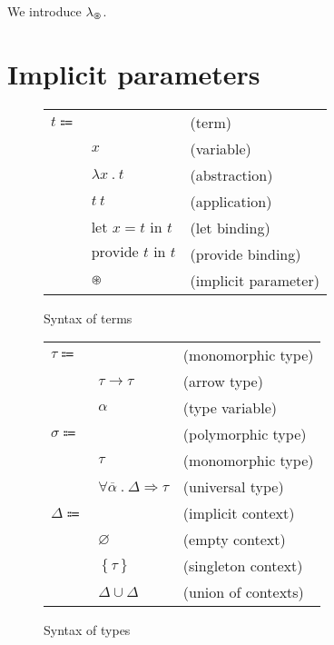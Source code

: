 \documentclass[acmlarge]{acmart}
\newcommand\lambdaimplicit{\lambda_{\varoast}}
\newcommand\labs[2]{\lambda #1 \ . \ #2}
\newcommand\app[2]{#1 \ #2}
\newcommand\llet[3]{\text{let } #1 = #2 \text{ in } #3}
\newcommand\provide[2]{\text{provide } #1 \text{ in } #2}
\newcommand\larrow[2]{#1 \rightarrow #2}
\newcommand\tabs[3]{\forall #1 \ . \ #2 \Rightarrow #3}
\begin{document}
  We introduce $\lambdaimplicit$.

\section{Implicit parameters}

  \begin{figure}[h!]
    \begin{mdframed}

      \begin{tabular}{l l l}
        $t \Coloneqq $ & & (term) \\
        & $x$ & (variable) \\
        & $\labs{x}{t}$ & (abstraction) \\
        & $\app{t}{t}$ & (application) \\
        & $\llet{x}{t}{t}$ & (let binding) \\
        & $\provide{t}{t}$ & (provide binding) \\
        & $\varoast$ & (implicit parameter)
      \end{tabular}

    \end{mdframed}
    \caption{Syntax of terms}
    \label{fig:terms_syntax}
  \end{figure}

  \begin{figure}[h!]
    \begin{mdframed}

      \begin{tabular}{l l l}
        $\tau \Coloneqq $ & & (monomorphic type) \\
        & $\larrow{\tau}{\tau}$ & (arrow type) \\
        & $\alpha$ & (type variable) \\
        $\sigma \Coloneqq $ & & (polymorphic type) \\
        & $\tau$ & (monomorphic type) \\
        & $\tabs{\overline{\alpha}}{\Delta}{\tau}$ & (universal type) \\
        $\Delta \Coloneqq $ & & (implicit context) \\
        & $\varnothing$ & (empty context) \\
        & $\left\{ \tau \right\}$ & (singleton context) \\
        & $\Delta \cup \Delta$ & (union of contexts)
      \end{tabular}

    \end{mdframed}
    \caption{Syntax of types}
    \label{fig:types_syntax}
  \end{figure}
\end{document}
